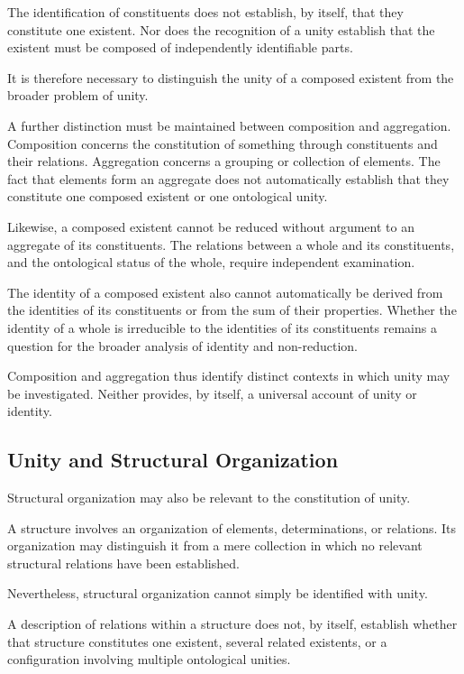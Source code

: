 The identification of constituents does not
establish, by itself, that they constitute
one existent. Nor does the recognition
of a unity establish that the existent must
be composed of independently identifiable
parts.

It is therefore necessary to distinguish
the unity of a composed existent from
the broader problem of unity.

A further distinction must be maintained
between composition and aggregation.
Composition concerns the constitution
of something through constituents and
their relations. Aggregation concerns
a grouping or collection of elements.
The fact that elements form an aggregate
does not automatically establish that
they constitute one composed existent
or one ontological unity.

Likewise, a composed existent cannot
be reduced without argument to an
aggregate of its constituents. The
relations between a whole and its
constituents, and the ontological status
of the whole, require independent
examination.

The identity of a composed existent
also cannot automatically be derived
from the identities of its constituents
or from the sum of their properties.
Whether the identity of a whole is
irreducible to the identities of its
constituents remains a question for
the broader analysis of identity and
non-reduction.

Composition and aggregation thus
identify distinct contexts in which
unity may be investigated. Neither
provides, by itself, a universal account
of unity or identity.

\subsection{Unity and Structural Organization}

Structural organization may also be
relevant to the constitution of unity.

A structure involves an organization
of elements, determinations, or relations.
Its organization may distinguish it from
a mere collection in which no relevant
structural relations have been established.

Nevertheless, structural organization
cannot simply be identified with unity.

A description of relations within a
structure does not, by itself, establish
whether that structure constitutes
one existent, several related existents,
or a configuration involving multiple
ontological unities.

